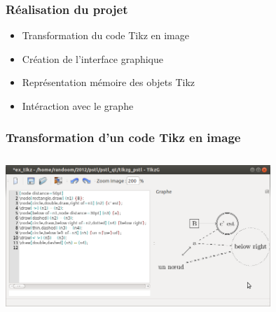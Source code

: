 \documentclass{beamer}
\begin{document}
\begin{frame}
\frametitle{Réalisation du projet} 


\begin{itemize}

\item Transformation du code Tikz en image

\item Création de l'interface graphique

\item Représentation mémoire des objets Tikz

\item Intéraction avec le graphe

\end{itemize}

\end{frame}

\begin{frame}
\frametitle{Transformation d'un code Tikz en image}
\centering
\includegraphics[width=10cm, height=6cm]{img/r_1.png}
\end{frame}
\end{document}
